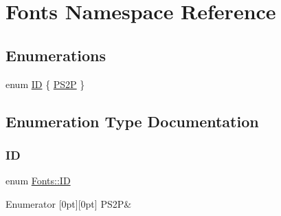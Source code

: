 \hypertarget{namespace_fonts}{}\section{Fonts Namespace Reference}
\label{namespace_fonts}
\subsection*{Enumerations}
\begin{DoxyCompactItemize}
\item 
enum \hyperlink{namespace_fonts_a240717ec0dc75e98501af734a02c396d}{ID} \{ \hyperlink{namespace_fonts_a240717ec0dc75e98501af734a02c396dab947c11fcf1d458feb7709e9c3733e65}{P\+S2P}
 \}
\end{DoxyCompactItemize}


\subsection{Enumeration Type Documentation}
\hypertarget{namespace_fonts_a240717ec0dc75e98501af734a02c396d}{}\label{namespace_fonts_a240717ec0dc75e98501af734a02c396d} 
\subsubsection{\texorpdfstring{ID}{ID}}
{\footnotesize\ttfamily enum \hyperlink{namespace_fonts_a240717ec0dc75e98501af734a02c396d}{Fonts\+::\+ID}}

\begin{DoxyEnumFields}{Enumerator}
[0pt][0pt]{}\hypertarget{namespace_fonts_a240717ec0dc75e98501af734a02c396dab947c11fcf1d458feb7709e9c3733e65}{}\label{namespace_fonts_a240717ec0dc75e98501af734a02c396dab947c11fcf1d458feb7709e9c3733e65} 
P\+S2P&\\
\hline

\end{DoxyEnumFields}
